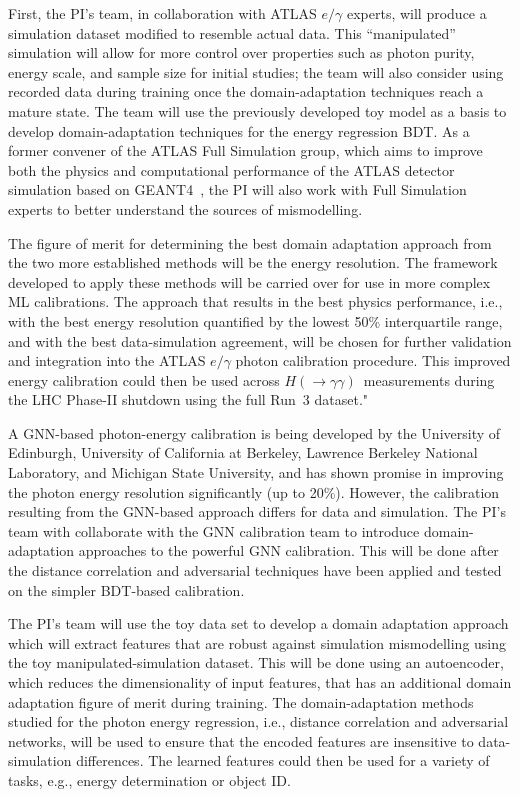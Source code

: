 \documentclass[letter, USenglish, 11pt, subfigure]{article}
\newcommand{\hyy}{\ensuremath{H(\to\gamma\gamma)}}
\begin{document}
First, the PI's team, in collaboration with ATLAS $e/\gamma$ experts, will produce a simulation dataset modified to resemble actual data. This ``manipulated'' simulation will allow for more control over properties such as photon purity, energy scale, and sample size for initial studies; the team will also consider using recorded data during training once the domain-adaptation techniques reach a mature state. The team will use the previously developed toy model as a basis to develop domain-adaptation techniques for the energy regression BDT. As a former convener of the ATLAS Full Simulation group, which aims to improve both the physics and computational performance of the ATLAS detector simulation based on GEANT4~\cite{Agostinelli:2002hh}, the PI will also work with Full Simulation experts to better understand the sources of mismodelling.

The figure of merit for determining the best domain adaptation approach from the two more established methods will be the energy resolution. The framework developed to apply these methods will be carried over for use in more complex ML calibrations. The approach that results in the best physics performance, i.e., with the best energy resolution quantified by the lowest 50\% interquartile range, and with the best data-simulation agreement, will be chosen for further validation and integration into the ATLAS $e/\gamma$ photon calibration procedure. This improved energy calibration could then be used across \hyy\ measurements during the LHC Phase-II shutdown using the full Run~3 dataset."

A GNN-based photon-energy calibration is being developed by the University of Edinburgh, University of California at Berkeley, Lawrence Berkeley National Laboratory, and Michigan State University, and has shown promise in improving the photon energy resolution significantly (up to 20\%). However, the calibration resulting from the GNN-based approach differs for data and simulation. The PI's team with collaborate with the GNN calibration team to introduce domain-adaptation approaches to the powerful GNN calibration. This will be done after the distance correlation and adversarial techniques have been applied and tested on the simpler BDT-based calibration.  

The PI's team will use the toy data set to develop a domain adaptation approach which will extract features that are robust against simulation mismodelling using the toy manipulated-simulation dataset. This will be done using an autoencoder, which reduces the dimensionality of input features, that has an additional domain adaptation figure of merit during training. The domain-adaptation methods studied for the photon energy regression, i.e., distance correlation and adversarial networks, will be used to ensure that the encoded features are insensitive to data-simulation differences. The learned features could then be used for a variety of tasks, e.g., energy determination or object ID.
\end{document}
